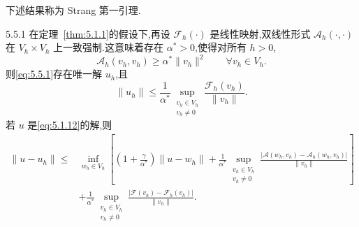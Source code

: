 下述结果称为 Strang 第一引理.

\begin{theorem}[]{5.5.1}
在定理~\ref{thm:5.1.1}的假设下,再设 \(\mathcal F_h(\cdot)\) 是线性映射,双线性形式 \(\mathcal A_h(\cdot,\cdot)\) 在 \(V_h\times V_h\) 上一致强制.这意味着存在 \(\alpha^*>0\),使得对所有 \(h>0\),
\begin{equation}\label{eq:5.5.2}
  \mathcal A_h(v_h,v_h)\ge\alpha^*\|v_h\|^2\qquad\forall v_h\in V_h.
\end{equation}
则\eqref{eq:5.5.1}存在唯一解 \(u_h\),且
\begin{equation}\label{eq:5.5.3}
  \|u_h\|\le\frac1{\alpha^*}\sup_{\substack{v_h\in V_h\\v_h\ne0}}
                \frac{\mathcal F_h(v_h)}{\|v_h\|}.
\end{equation}
若 \(u\) 是\eqref{eq:5.1.12}的解,则
\begin{equation}\label{eq:5.5.4}
  \begin{aligned}
    \|u-u_h\|\le{}&
      \inf_{w_h\in V_h}\left[\left(1+\frac\gamma{\alpha^*}\right)\|u-w_h\|
        +\frac1{\alpha^*}\sup_{\substack{v_h\in V_h\\v_h\ne0}}
           \frac{|\mathcal A(w_h,v_h)-\mathcal A_h(w_h,v_h)|}{\|v_h\|}\right]\\
    &+\frac1{\alpha^*}\sup_{\substack{v_h\in V_h\\v_h\ne0}}
          \frac{|\mathcal F(v_h)-\mathcal F_h(v_h)|}{\|v_h\|}.
  \end{aligned}
\end{equation}
\end{theorem}

